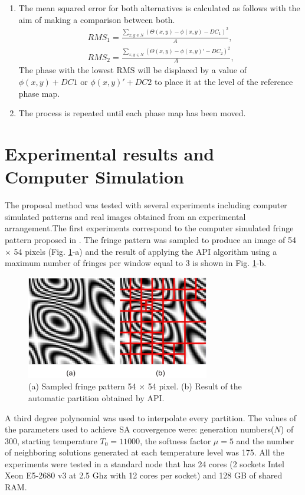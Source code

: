 \documentclass[review]{elsarticle}
\begin{document}
\begin{enumerate}
	\item The mean squared error for both alternatives is calculated as follows with the aim of making a comparison between both. 
	\begin{eqnarray}\label{eq8}
	RMS_1= \frac{\sum_{x,y\in N}(\varTheta(x,y) -\phi(x,y) - DC_1)^2}{A} \text{,} \nonumber \\
	RMS_2= \frac{\sum_{x,y\in N}(\varTheta(x,y) -\phi(x,y)'-DC_2)^2}{A} \text{,} 
	\end{eqnarray}
The phase with the lowest RMS will be displaced by a value of $\phi(x,y) + DC1$ or $\phi(x,y)' + DC2$ to place it at the level of the reference phase map.
	\item The process is repeated until each phase map has been moved.
\end{enumerate}

\section{Experimental results and Computer Simulation}

The proposal method was tested with several experiments including computer simulated patterns and real images obtained from an experimental arrangement.The first experiments correspond to the computer simulated fringe pattern proposed in \cite{Toledo2008}. The fringe pattern was sampled to produce an image of 54 $\times$ 54 pixels (Fig. \ref{Fig4}-a) and  the result of applying the  API algorithm using a maximum number of fringes per window equal to 3 is shown in Fig. \ref{Fig4}-b.
\begin{figure}[ht!]
\centering\includegraphics[width=8cm]{fig4}
\caption{(a) Sampled fringe pattern 54 $\times$ 54 pixel. (b) Result of the automatic partition obtained by API.}
\label{Fig4}
\end{figure}

A third degree polynomial was used to interpolate every partition. The values of the parameters used to achieve SA convergence were: generation numbers($N$) of 300, starting temperature $T_0 = 11 000$, the softness factor $\mu = 5$ and the number of neighboring solutions generated at each temperature level was 175. All the experiments were tested in a standard node that has 24 cores (2 sockets Intel Xeon E5-2680 v3 at 2.5 Ghz with 12 cores per socket) and 128 GB of shared RAM.
\end{document}

